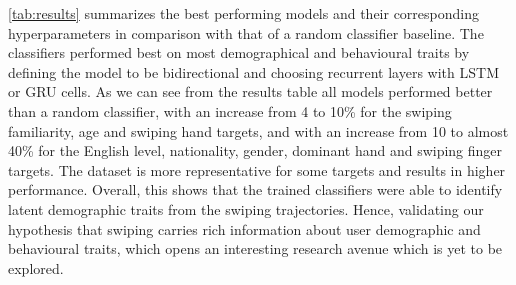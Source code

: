\documentclass[11pt,oneside,a4paper,openright]{book}
\begin{document}

\vspace{2cm}
\autoref{tab:results} summarizes the best performing models and their corresponding hyperparameters in comparison with that of a random classifier baseline. The classifiers performed best on most demographical and behavioural traits by defining the model to be bidirectional and choosing recurrent layers with LSTM or GRU cells. As we can see from the results table all models performed  better than a random classifier, with an increase from 4 to 10\% for the swiping familiarity, age and swiping hand targets, and with an increase from 10 to almost 40\% for the English level, nationality, gender, dominant hand and swiping finger targets. The dataset is more representative for some targets and results in higher performance.  Overall, this shows that the trained classifiers were able to identify latent demographic traits from the swiping trajectories. Hence, validating our hypothesis that swiping carries rich information about user demographic and behavioural traits, which opens an interesting research avenue which is yet to be explored.
\end{document}

